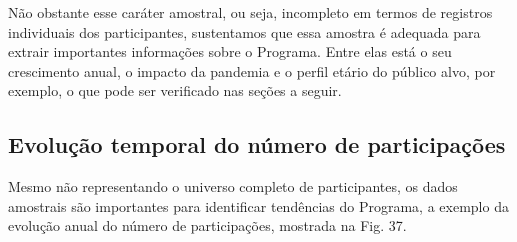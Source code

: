 Não obstante esse caráter amostral, ou seja, incompleto em termos de registros individuais dos participantes, sustentamos que essa amostra é adequada para extrair importantes informações sobre o Programa. Entre elas está o seu crescimento anual, o impacto da pandemia e o perfil etário do público alvo, por exemplo, o que pode ser verificado nas seções a seguir.

\subsection[Evolução temporal do número de participações]{Evolução temporal do número de participações}\label{Evolução temporal do número de participações}
Mesmo não representando o universo completo de participantes, os dados amostrais são importantes para identificar tendências do Programa, a exemplo da evolução anual do número de participações, mostrada na Fig. 37.



